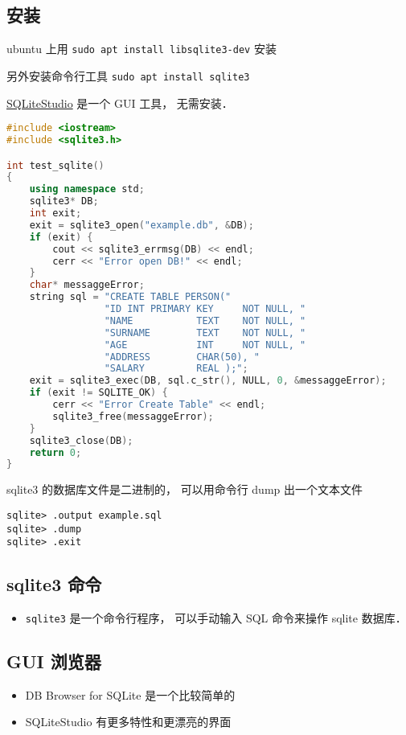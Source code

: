 
\begin{issues}
\issueDraft
\end{issues}


\subsection{安装}
ubuntu 上用 \verb|sudo apt install libsqlite3-dev| 安装

另外安装命令行工具 \verb|sudo apt install sqlite3|

\href{https://sqlitestudio.pl/}{SQLiteStudio} 是一个 GUI 工具， 无需安装．

\begin{lstlisting}[language=cpp]
#include <iostream>
#include <sqlite3.h>

int test_sqlite()
{
	using namespace std;
    sqlite3* DB;
    int exit;
    exit = sqlite3_open("example.db", &DB);
    if (exit) {
		cout << sqlite3_errmsg(DB) << endl;
        cerr << "Error open DB!" << endl;
    }
	char* messaggeError;
	string sql = "CREATE TABLE PERSON("
                 "ID INT PRIMARY KEY     NOT NULL, "
                 "NAME           TEXT    NOT NULL, "
                 "SURNAME        TEXT    NOT NULL, "
                 "AGE            INT     NOT NULL, "
                 "ADDRESS        CHAR(50), "
                 "SALARY         REAL );";
	exit = sqlite3_exec(DB, sql.c_str(), NULL, 0, &messaggeError);
    if (exit != SQLITE_OK) {
        cerr << "Error Create Table" << endl;
        sqlite3_free(messaggeError);
    }
    sqlite3_close(DB);
    return 0;
}
\end{lstlisting}

sqlite3 的数据库文件是二进制的， 可以用命令行 dump 出一个文本文件
\begin{lstlisting}
sqlite> .output example.sql
sqlite> .dump
sqlite> .exit
\end{lstlisting}

\subsection{sqlite3 命令}
\begin{itemize}
\item \verb|sqlite3| 是一个命令行程序， 可以手动输入 SQL 命令来操作 sqlite 数据库．
\end{itemize}

\subsection{GUI 浏览器}
\begin{itemize}
\item DB Browser for SQLite 是一个比较简单的
\item SQLiteStudio 有更多特性和更漂亮的界面
\end{itemize}
